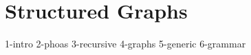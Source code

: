\section{Structured Graphs}
\label{sec:paper}

{1-intro}
{2-phoas}
{3-recursive}
{4-graphs}
{5-generic}
{6-grammar}
